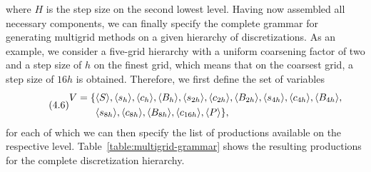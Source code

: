 where $H$ is the step size on the second lowest level.
Having now assembled all necessary components, we can finally specify the complete grammar for generating multigrid methods on a given hierarchy of discretizations.
As an example, we consider a five-grid hierarchy with a uniform coarsening factor of two and a step size of $h$ on the finest grid, which means that on the coarsest grid, a step size of $16h$ is obtained.
Therefore, we first define the set of variables 
\begin{equation}\tag{4.6}
\begin{split}
	V = \{ & \langle S \rangle, \langle s_h \rangle, \langle c_h \rangle, \langle B_h \rangle, \langle s_{2h} \rangle, \langle c_{2h} \rangle, \langle B_{2h} \rangle, \langle s_{4h} \rangle, \langle c_{4h} \rangle, \langle B_{4h} \rangle, \\
	& \langle s_{8h} \rangle, \langle c_{8h} \rangle, \langle B_{8h} \rangle, \langle c_{16h} \rangle, \langle P \rangle \},
\end{split}
\label{eq:multigrid-grammar-variables}
\end{equation}
for each of which we can then specify the list of productions available on the respective level. 
Table~\ref{table:multigrid-grammar} shows the resulting productions for the complete discretization hierarchy.
